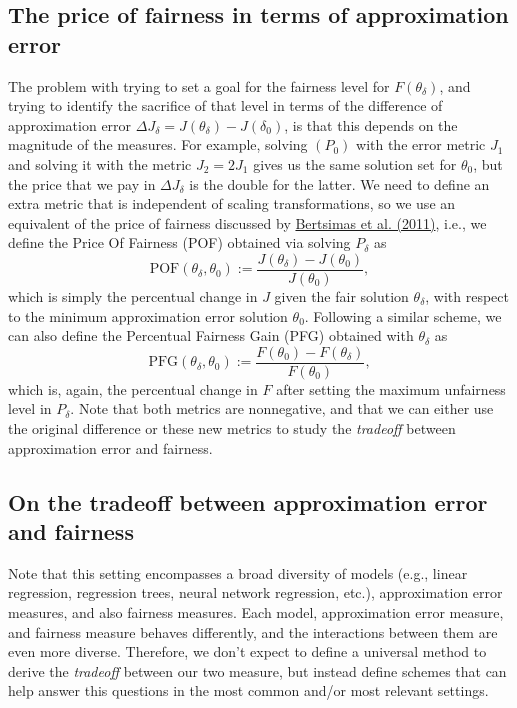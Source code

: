 \documentclass[11pt]{article}
\theoremstyle{plain}
\theoremstyle{definition}
\newcommand{\1}{\mathbf{1}}
\begin{document}
\subsection{The price of fairness in terms of approximation error}

The problem with trying to set a goal for the fairness level for $F(\theta_\delta)$, and trying to identify the sacrifice of that level in terms of the difference of approximation error $\Delta J_\delta = J(\theta_\delta) - J(\delta_0)$, is that this depends on the magnitude of the measures. For example, solving $(P_0)$ with the error metric $J_1$ and solving it with the metric $J_2 = 2J_1$ gives us the same solution set for $\theta_0$, but the price that we pay in $\Delta J_\delta$ is the double for the latter. We need to define an extra metric that is independent of scaling transformations, so we use an equivalent of the price of fairness discussed by \href{https://pubsonline.informs.org/doi/10.1287/opre.1100.0865}{Bertsimas et al. (2011)}, i.e., we define the Price Of Fairness (POF) obtained via solving $P_\delta$ as
\begin{equation}
\text{POF}(\theta_\delta, \theta_0) := \frac{J(\theta_\delta) - J(\theta_0)}{J(\theta_0)},
\end{equation}
which is simply the percentual change in $J$ given the fair solution $\theta_\delta$, with respect to the minimum approximation error solution $\theta_0$. Following a similar scheme, we can also define the Percentual Fairness Gain (PFG) obtained with $\theta_\delta$ as 
\begin{equation}
\text{PFG}(\theta_\delta, \theta_0) := \frac{F(\theta_0) - F(\theta_\delta)}{F(\theta_0)},
\end{equation}
which is, again, the percentual change in $F$ after setting the maximum unfairness level in $P_\delta$. Note that both metrics are nonnegative, and that we can either use the original difference or these new metrics to study the \textit{tradeoff} between approximation error and fairness.


\subsection{On the tradeoff between approximation error and fairness}



Note that this setting encompasses a broad diversity of models (e.g., linear regression, regression trees, neural network regression, etc.), approximation error measures, and also fairness measures. Each model, approximation error measure, and fairness measure behaves differently, and the interactions between them are even more diverse. Therefore, we don't expect to define a universal method to derive the \textit{tradeoff} between our two measure, but instead define schemes that can help answer this questions in the most common and/or most relevant settings.
\end{document}
